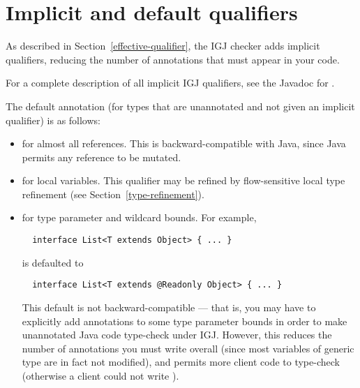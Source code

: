 

\section{Implicit and default qualifiers\label{igj-implicit-qualifiers}}

As described in Section~\ref{effective-qualifier}, the IGJ checker
adds implicit qualifiers, reducing the number of annotations that must
appear in your code.

For a complete description of all implicit IGJ qualifiers, see the
Javadoc for .

The default annotation (for types that are unannotated and not given an
implicit qualifier) is as follows:
\begin{itemize}
\item
   for almost all references.  This is backward-compatible
  with Java, since Java permits any reference to be mutated.
\item
   for local variables.  This qualifier may be refined by
  flow-sensitive local type refinement (see Section~\ref{type-refinement}).
\item
   for type parameter and wildcard bounds.  For example,

\begin{Verbatim}
  interface List<T extends Object> { ... }
\end{Verbatim}

\noindent
is defaulted to

\begin{Verbatim}
  interface List<T extends @Readonly Object> { ... }
\end{Verbatim}

This default is not backward-compatible --- that is, you may have to
explicitly add  annotations to some type parameter bounds in
order to make unannotated Java code type-check under IGJ\@.  However, this
reduces the number of annotations you must write overall (since most
variables of generic type are in fact not modified), and permits more
client code to type-check (otherwise a client could not write
).

\end{itemize}



